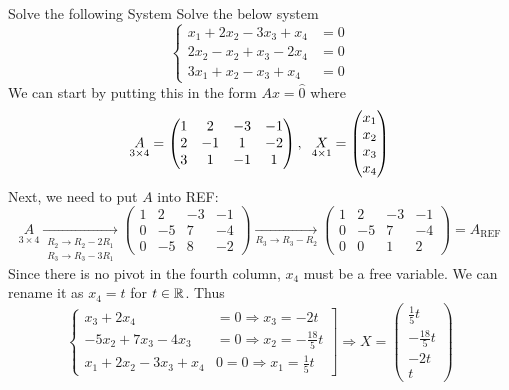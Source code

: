 \begin{example}{Solve the following System}{}
    Solve the below system
    \[\begin{cases}
        x_1 + 2x_2 - 3x_3 + x_4 &= 0 \\
        2x_2 - x_2 + x_3 - 2x_4 &= 0 \\
        3x_1 + x_2 - x_3 + x_4 &= 0
    \end{cases}\]
    We can start by putting this in the form $Ax=\hat{0}$ where 
    \[\underset{3 \times 4}{A} = \begin{pmatrix}
        1 & 2 & -3 & -1 \\
        2 & -1 & 1 & -2 \\
        3 & 1 & -1 & 1
    \end{pmatrix}, \hspace{0.2cm}
    \underset{4 \times 1}{X} = \begin{pmatrix}
        x_1 \\ x_2 \\ x_3 \\ x_4
    \end{pmatrix}\]
    Next, we need to put $A$ into REF: 
    \[
        \underset{3 \times 4}A \xrightarrow[\substack{R_2 \to R_2 - 2R_1 \\ R_3 \to R_3 - 3R_1}]{} 
        \begin{pmatrix}
            1 & 2 & -3 & -1 \\
            0 & -5 & 7 & -4 \\
            0 & -5 & 8 & -2
        \end{pmatrix} 
        \xrightarrow[R_3 \to R_3 - R_2]{}
        \begin{pmatrix}
            1 & 2 & -3 & -1 \\
            0 & -5 & 7 & -4 \\
            0 & 0 & 1 & 2
        \end{pmatrix} 
        = A_{\text{REF}}
    \]
    Since there is no pivot in the fourth column, $x_4$ must be a free variable. We can rename it as $x_4=t$ for $t \in \mathbb R$. Thus
    \[
        \left.\begin{cases}
            x_3 + 2x_4 &= 0 \Rightarrow x_3 = -2t \\
            -5x_2 + 7x_3 - 4x_3 &= 0 \Rightarrow x_2 = -\frac{18}{5}t \\
            x_1 + 2x_2 - 3x_3 + x_4 &0 = 0 \Rightarrow x_1 = \frac{1}{5}t 
        \end{cases}\right]
        \Rightarrow
        X = \begin{pmatrix} \frac{1}{5}t \\ -\frac{18}{5}t \\ -2t \\ t \end{pmatrix}
\]
\end{example}
